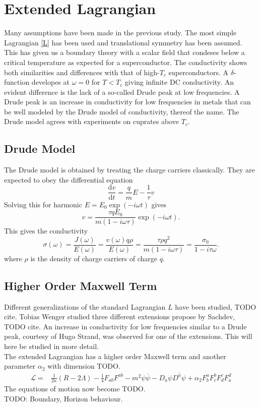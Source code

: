 \documentclass[12pt]{report}
\renewcommand{\d}{\ensuremath{\mathrm{d}}}
\renewcommand{\i}{\ensuremath{i}}
\begin{document}
\chapter{Extended Lagrangian\label{higherOrder}}
Many assumptions have been made in the previous study. The most simple Lagrangian \eqref{L} has been used and translational symmetry has been assumed. This has given us a boundary theory with a scalar field that condeses below a critical temperature as expected for a superconductor. The conductivity shows both similarities and differences with that of high-$T_c$ superconductors. A $\delta$-function developes at $\omega=0$ for $T<T_c$ giving infinite DC conductivity. An evident difference is the lack of a so-called Drude peak at low frequencies. A Drude peak is an increase in conductivity for low frequencies in metals that can be well modeled by the Drude model of conductivity\cite{drude}, thereof the name. The Drude model agrees with experiments on cuprates above $T_c$\cite{drudeFit}.

\section{Drude Model}
The Drude model is obtained by treating the charge carriers classically. They are expected to obey the differential equation
\begin{equation}
 \frac{\d v}{\d t}=\frac{q}{m}E-\frac{1}{\tau}v
\end{equation}
Solving this for harmonic $E=E_0\exp(-\i\omega t)$ gives 
\begin{equation}
 v=\frac{\tau qE_0}{m(1-\i\omega\tau)}\exp(-\i\omega t).
\end{equation}
This gives the conductivity
\begin{equation}
 \sigma(\omega)=\frac{J(\omega)}{E(\omega)}=\frac{v(\omega)q\rho}{E(\omega)}=\frac{\tau\rho q^2}{m(1-\i\omega\tau)}=\frac{\sigma_0}{1-\i\tau\omega}.
\end{equation}
where $\rho$ is the density of charge carriers of charge $q$.
\section{Higher Order Maxwell Term}
Different generalizations of the standard Lagrangian $L$ have been studied, TODO cite. Tobias Wenger studied three different extensions propose by Sachdev, TODO cite. An increase in conductivity for low frequencies similar to a Drude peak, courtesy of Hugo Strand, was observed for one of the extensions. This will here be studied in more detail.\\
The extended Lagrangian has a higher order Maxwell term and another parameter $\alpha_2$ with dimension TODO.
\begin{eqnarray}
 \mathcal{L}=&\frac{1}{2\kappa}\left(R-2\Lambda\right)-\frac{1}{4}F_{ab}F^{ab}-m^2\psi\overline{\psi}-D_a\psi\overline{D^a\psi}
+\alpha_2F^a_bF^b_cF^c_dF^d_a\label{L2}
\end{eqnarray}
The equations of motion now become TODO.\\
TODO: Boundary, Horizon behaviour.\\
\end{document}
